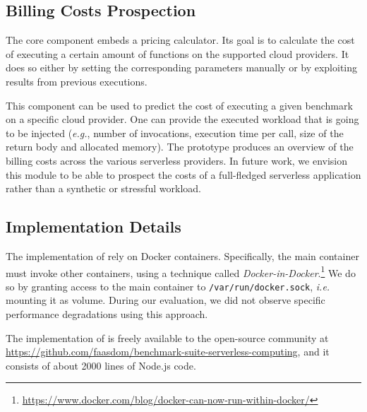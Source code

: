 \subsection{Billing Costs Prospection}

The core component embeds a pricing calculator.
Its goal is to calculate the cost of executing a certain amount of functions on the supported cloud providers. 
It does so either by setting the corresponding parameters manually or by exploiting results from previous executions.

This component can be used to predict the cost of executing a given benchmark on a specific cloud provider.
One can provide the executed workload that is going to be injected (\emph{e.g.}, number of invocations, execution time per call, size of the return body and allocated memory).
The \sys prototype produces an overview of the billing costs across the various serverless providers.
In future work, we envision this module to be able to prospect the costs of a full-fledged serverless application rather than a synthetic or stressful workload.

\subsection{Implementation Details}\label{ssec:impl}
The implementation of \sys rely on Docker containers.
Specifically, the main container must invoke other containers, using a technique called \emph{Docker-in-Docker}.\footnote{\url{https://www.docker.com/blog/docker-can-now-run-within-docker/}}
We do so by granting access to the main container to \texttt{/var/run/docker.sock}, \emph{i.e.} mounting it as volume.
During our evaluation, we did not observe specific performance degradations using this approach.

The implementation of \sys is freely available to the open-source community at \url{https://github.com/faasdom/benchmark-suite-serverless-computing}, and it consists of about 2000 lines of Node.js code.